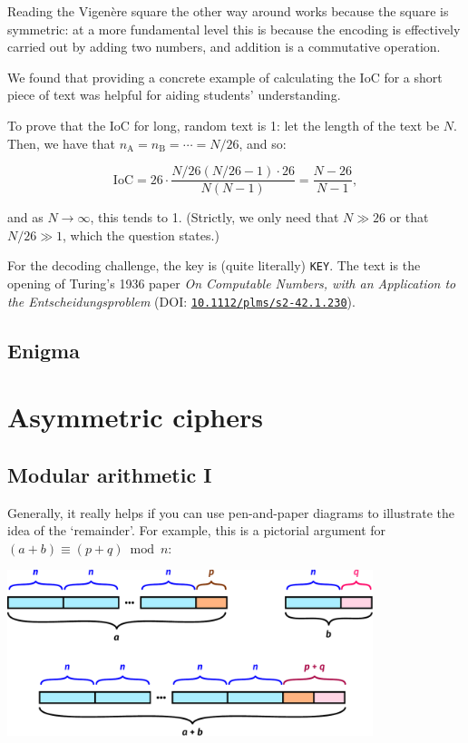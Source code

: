 \documentclass[12pt]{article}
\begin{document}
Reading the Vigen{\`e}re square the other way around works because the square is symmetric: at a more fundamental level this is because the encoding is effectively carried out by adding two numbers, and addition is a commutative operation.

We found that providing a concrete example of calculating the IoC for a short piece of text was helpful for aiding students' understanding.

To prove that the IoC for long, random text is 1: let the length of the text be $N$.
Then, we have that $n_\text{A} = n_\text{B} = \cdots = N/26$, and so:

$$\text{IoC} = 26 \cdot \frac{N/26(N/26 - 1) \cdot 26}{N(N - 1)} = \frac{N - 26}{N - 1},$$

and as $N \to \infty$, this tends to 1. (Strictly, we only need that $N \gg 26$ or that $N / 26 \gg 1$, which the question states.)

For the decoding challenge, the key is (quite literally) \texttt{KEY}.
The text is the opening of Turing's 1936 paper \emph{On Computable Numbers, with an Application to the Entscheidungsproblem} (DOI: \href{https://doi.org/10.1112/plms/s2-42.1.230}{\texttt{10.1112/plms/s2-42.1.230}}).

\subsection{Enigma}

\pagebreak
\section*{Asymmetric ciphers}

\subsection{Modular arithmetic I}

Generally, it really helps if you can use pen-and-paper diagrams to illustrate the idea of the `remainder'.
For example, this is a pictorial argument for $(a + b) \equiv (p + q) \bmod n$:

\begin{center}
    \includegraphics[width=0.8\textwidth]{modulo.pdf}
\end{center}
\end{document}
